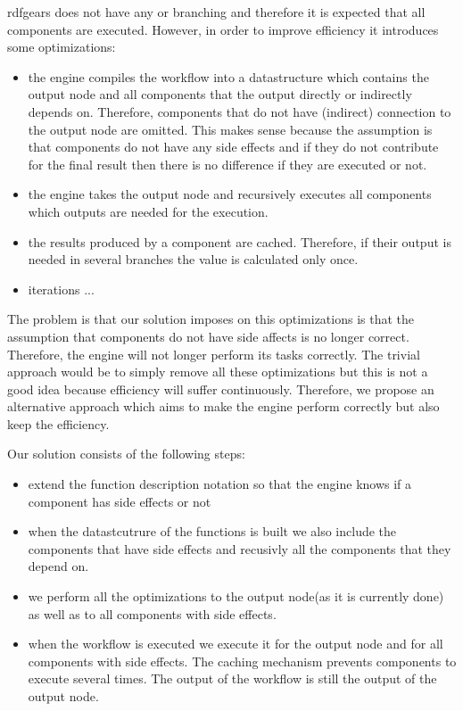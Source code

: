 \documentclass[a4paper, notitlepage]{article}
\begin{document}
rdfgears does not have any or branching and therefore it is expected that all components are executed. However, in order to improve efficiency it introduces some optimizations:
\begin{itemize}
	\item the engine compiles the workflow into a datastructure which contains the output node and all components that the output directly or indirectly depends on. Therefore, components that do not have (indirect) connection to the output node are omitted. This makes sense because the assumption is that components do not have any side effects and if they do not contribute for the final result then there is no difference if they are executed or not.
	
	\item the engine takes the output node and recursively executes all components which outputs are needed for the execution.
	  
	\item the results produced by a component are cached. Therefore, if their output is needed in several branches the value is calculated only once.
	
	\item iterations ...  
\end{itemize}

The problem is that our solution imposes on this optimizations is that the assumption that components do not have side affects is no longer correct. Therefore, the engine will not longer perform its tasks correctly. The trivial approach would be to simply remove all these optimizations but this is not a good idea because efficiency will suffer continuously. Therefore, we propose an alternative approach which aims to make the engine perform correctly but also keep the efficiency.

Our solution consists of the following steps:
\begin{itemize}
	\item extend the function description notation so that the engine knows if a component has side effects or not
	\item when the datastcutrure of the functions is built we also include the components that have side effects and recusivly all the components that they depend on.
	\item we perform all the optimizations to the output node(as it is currently done) as well as to all components with side effects. 
	\item when the workflow is executed we execute it for the output node and for all components with side effects. The caching mechanism prevents components to execute several times. The output of the workflow is still the output of the output node.
\end{itemize}
\end{document}
